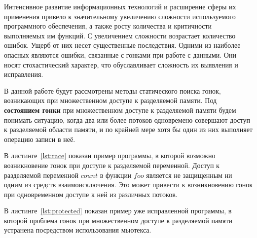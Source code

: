\Introduction

Интенсивное развитие информационных технологий и расширение сферы их применения привело к значительному увеличению сложности используемого программного обеспечения, а также росту количества и критичности выполняемых им функций. С увеличением сложности возрастает количество ошибок. Ущерб от них несет существенные последствия. Одними из наиболее опасных являются ошибки, связанные с гонками при работе с данными. Они носят стохастический характер, что обуславливает сложность их выявления и исправления.

В данной работе будут рассмотрены методы статического поиска гонок, возникающих при множественном доступе к разделяемой памяти. 
Под \textbf{состоянием гонки} при множественном доступе к разделяемой памяти будем понимать ситуацию, когда два или более потоков одновремено совершают доступ к разделяемой области памяти, и по крайней мере хотя бы один из них выполняет операцию записи в неё.

В листинге~\ref{lst:race} показан пример программы, в которой возможно возникновение гонок при доступе к разделяемой переменной. Доступ к разделяемой переменной $count$ в функции $foo$ является не защищенным ни одним из средств взаимоисключения. Это может привести к возникновению гонок при одновременном доступе к ней из различных потоков.

В листинге~\ref{lst:protected} показан пример уже исправленной программы, в которой проблема гонок при множественном доступе к разделяемой памяти устранена посредством использования мьютекса.




